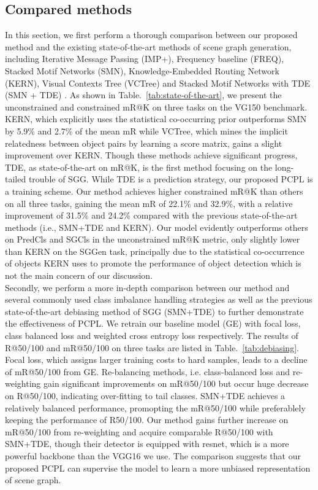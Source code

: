 \documentclass[sigconf]{acmart}
\begin{document}
\subsection{Compared methods}
In this section, we first perform a thorough comparison between our proposed method and the existing state-of-the-art methods of scene graph generation, including Iterative Message Passing (IMP+)\cite{xu17}, Frequency baseline (FREQ)\cite{zellers18}, Stacked Motif Networks (SMN)\cite{zellers18}, Knowledge-Embedded Routing Network (KERN)\cite{chen19}, Visual Contexts Tree (VCTree)\cite{tang19} and Stacked Motif Networks with TDE (SMN + TDE) \cite{tang20}.
As shown in Table.~\ref{tab:state-of-the-art}, we present the unconstrained and constrained mR@K on three tasks on the VG150 benchmark. KERN, which explicitly uses the statistical co-occurring prior outperforms SMN by 5.9\% and 2.7\% of the mean mR while VCTree, which mines the implicit relatedness between object pairs by learning a score matrix, gains a slight improvement over KERN.
Though these methods achieve significant progress, TDE, as state-of-the-art on mR@K, is the first method focusing on the long-tailed trouble of SGG. While TDE is a prediction strategy, our proposed PCPL is a training scheme. Our method achieves higher constrained mR@K than others on all three tasks, gaining the mean mR of 22.1\% and 32.9\%, with a relative improvement of 31.5\% and 24.2\% compared with the previous state-of-the-art methods (i.e., SMN+TDE and KERN). Our model evidently outperforms others on PredCls and SGCls in the unconstrained mR@K metric, only slightly lower than KERN on the SGGen task, principally due to the statistical co-occurrence of objects KERN uses to promote the performance of object detection which is not the main concern of our discussion.
\\\indent Secondly, we perform a more in-depth comparison between our method and several commonly used class imbalance handling strategies as well as the previous state-of-the-art debiasing method of SGG (SMN+TDE) to further demonstrate the effectiveness of PCPL. We retrain our baseline model (GE) with focal loss\cite{lin17}, class balanced loss\cite{cui19} and weighted cross entropy loss respectively. The results of R@50/100 and mR@50/100 on three tasks are listed in Table.~\ref{tab:debiasing}. Focal loss, which assigns larger training costs to hard samples, leads to a decline of mR@50/100 from GE. Re-balancing methods, i.e. class-balanced loss and re-weighting gain significant improvements on mR@50/100 but occur huge decrease on R@50/100, indicating over-fitting to tail classes. SMN+TDE\cite{tang20} achieves a relatively balanced performance, promopting the mR@50/100 while preferablely keeping the performance of R50/100. Our method gains further increase on mR@50/100 from re-weighting and acquire comparable R@50/100 with SMN+TDE, though their detector is equipped with resnet\cite{resnet}, which is a more powerful backbone than the VGG16 we use. The comparison suggests that our proposed PCPL can supervise the model to learn a more unbiased representation of scene graph. 
\end{document}
